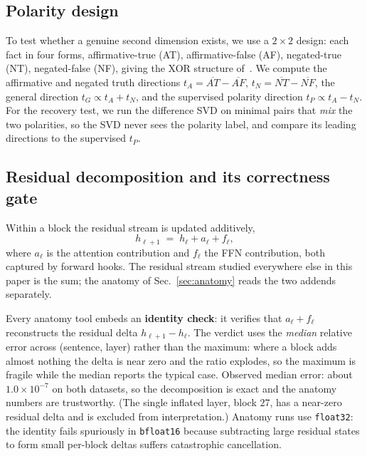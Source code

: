 \documentclass[11pt]{article}
\begin{document}
\subsection{Polarity design}
\label{sec:poldesign}

To test whether a genuine second dimension exists, we use a $2{\times}2$
design: each fact in four forms, affirmative-true (AT), affirmative-false
(AF), negated-true (NT), negated-false (NF), giving the XOR structure
of~\cite{burger2024}. We compute the affirmative and negated truth directions
$t_A = \overline{AT} - \overline{AF}$, $t_N = \overline{NT} - \overline{NF}$,
the general direction $t_G \propto t_A + t_N$, and the supervised polarity
direction $t_P \propto t_A - t_N$. For the recovery test, we run the
difference SVD on minimal pairs that \emph{mix} the two polarities, so the
SVD never sees the polarity label, and compare its leading directions to the
supervised $t_P$.

\subsection{Residual decomposition and its correctness gate}
\label{sec:decomp}

Within a block the residual stream is updated additively,
\begin{equation}
h_{\ell+1} \;=\; h_{\ell} + a_{\ell} + f_{\ell},
\end{equation}
where $a_{\ell}$ is the attention contribution and $f_{\ell}$ the FFN
contribution, both captured by forward hooks. The residual stream studied
everywhere else in this paper is the sum; the anatomy of
Sec.~\ref{sec:anatomy} reads the two addends separately.

Every anatomy tool embeds an \textbf{identity check}: it verifies that
$a_{\ell} + f_{\ell}$ reconstructs the residual delta $h_{\ell+1} - h_{\ell}$.
The verdict uses the \emph{median} relative error across (sentence, layer)
rather than the maximum: where a block adds almost nothing the delta is near
zero and the ratio explodes, so the maximum is fragile while the median
reports the typical case. Observed median error: about $1.0 \times 10^{-7}$
on both datasets, so the decomposition is exact and the anatomy numbers are
trustworthy. (The single inflated layer, block $27$, has a near-zero residual
delta and is excluded from interpretation.) Anatomy runs use
\texttt{float32}: the identity fails spuriously in \texttt{bfloat16} because
subtracting large residual states to form small per-block deltas suffers
catastrophic cancellation.
\end{document}
